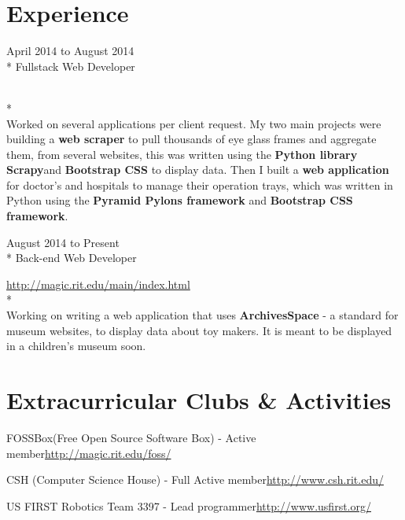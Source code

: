 \documentclass[a4paper,margin,line]{resume}
\newcommand{\rurl}[1]{\hfill {\footnotesize \url{#1}}}
\newcommand{\rdate}[1]{\hfill {\small #1}}
\newcommand{\rproject}[4]{\item[#1] \hfill \rdate{#2} \\* \hfill \rdate{#3} \strut\hfill \rurl{#4} \\*}
\begin{document}
\begin{resume}
\section{\mysidestyle Experience}
	\begin{asparadesc}
        \rproject{Earth Moves}{April 2014 to August 2014}{Fullstack Web Developer}{}
        \\
		\small
        Worked on several applications per client request. My two main projects
        were building a {\bf web scraper} to pull thousands of eye glass frames and
        aggregate them, from several websites, this was written using the {\bf Python
        library Scrapy}and {\bf Bootstrap CSS} to display data. Then I built a {\bf web
        application} for doctor's and hospitals to manage their operation trays,
        which was written in Python using the {\bf Pyramid Pylons framework} and
        {\bf Bootstrap CSS framework}. \normalsize
		\\
        \rproject{Media Arts Games Interaction and Creativity Center at RIT}{August 2014 to Present}{Back-end Web Developer}{http://magic.rit.edu/main/index.html}
        \\
		\small
        Working on writing a web application that uses {\bf ArchivesSpace} - a
        standard for museum websites, to display data about toy makers. It is
        meant to be displayed in a children's museum soon. \end{asparadesc}
\section{\mysidestyle Extracurricular Clubs \& Activities}
	\begin{asparablank}
    \item FOSSBox({\small Free Open Source Software Box}) - {\small Active member}\rurl{http://magic.rit.edu/foss/}
    \item CSH ({\small Computer Science House}) - {\small Full Active member}\rurl{http://www.csh.rit.edu/}
    \item US FIRST Robotics Team 3397 - {\small Lead programmer}\rurl{http://www.usfirst.org/}
	\end{asparablank}

\end{resume}
\end{document}
